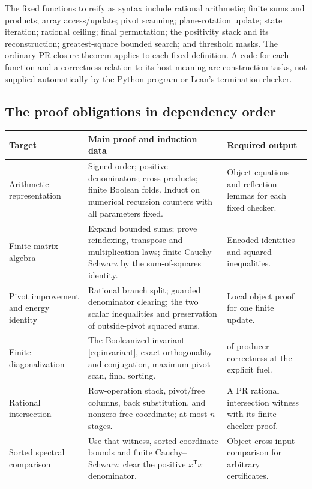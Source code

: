 The fixed functions to reify as  syntax include rational arithmetic; finite sums and products; array access/update; pivot scanning; plane-rotation update; state iteration; rational ceiling; final permutation; the positivity stack and its reconstruction; greatest-square bounded search; and threshold masks. The ordinary PR closure theorem applies to each fixed definition. A  code for each function and a correctness relation to its host meaning are construction tasks, not supplied automatically by the Python program or Lean's termination checker.

\subsection{The proof obligations in dependency order}

\begin{longtable}{@{}P{0.25\textwidth}P{0.43\textwidth}P{0.26\textwidth}@{}}
\toprule
Target & Main proof and induction data & Required output \\
\midrule\endhead
Arithmetic representation & Signed order; positive denominators; cross-products; finite Boolean folds. Induct on numerical recursion counters with all parameters fixed. & Object equations and reflection lemmas for each fixed checker. \\
Finite matrix algebra & Expand bounded sums; prove reindexing, transpose and multiplication laws; finite Cauchy--Schwarz by the sum-of-squares identity. & Encoded identities and squared inequalities. \\
Pivot improvement and energy identity & Rational branch split; guarded denominator clearing; the two scalar inequalities and preservation of outside-pivot squared sums. & Local object proof for one finite update. \\
Finite diagonalization & The Booleanized invariant \eqref{eq:invariant}, exact orthogonality and conjugation, maximum-pivot scan, final sorting. &  of producer correctness at the explicit fuel. \\
Rational intersection & Row-operation stack, pivot/free columns, back substitution, and nonzero free coordinate; at most $n$ stages. & A PR rational intersection witness with its finite checker proof. \\
Sorted spectral comparison & Use that witness, sorted coordinate bounds and finite Cauchy--Schwarz; clear the positive $x^{\mathsf T}x$ denominator. & Object cross-input comparison for arbitrary certificates. \\

\end{longtable}
